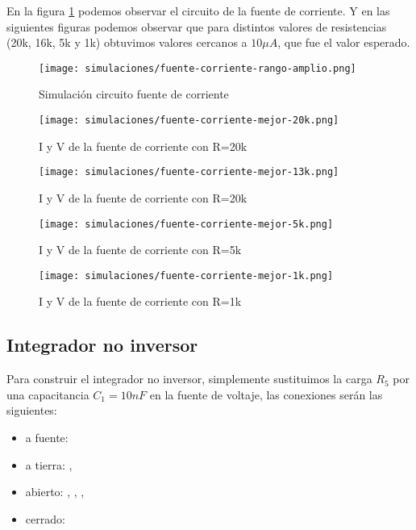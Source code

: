 En la figura \ref{fig:sim-fuente-corriente} podemos observar el circuito de la fuente de corriente. Y en las siguientes figuras podemos observar que para distintos valores de resistencias (20k, 16k, 5k y 1k) obtuvimos valores cercanos a $10\mu A$, que fue el valor esperado.

\begin{figure}[ht]
    \centering
    \texttt{[image: simulaciones/fuente-corriente-rango-amplio.png]}
    \caption{Simulación circuito fuente de corriente}
    \label{fig:sim-fuente-corriente}
\end{figure}
\begin{figure}[ht]
    \centering
    \texttt{[image: simulaciones/fuente-corriente-mejor-20k.png]}
    \caption{I y V de la fuente de corriente con R=20k}
    \label{fig:sim-fuente-corriente-20k}
\end{figure}
\begin{figure}[ht]
    \centering
    \texttt{[image: simulaciones/fuente-corriente-mejor-13k.png]}
    \caption{I y V de la fuente de corriente con R=20k}
    \label{fig:sim-fuente-corriente-13k}
\end{figure}
\begin{figure}[ht]
    \centering
    \texttt{[image: simulaciones/fuente-corriente-mejor-5k.png]}
    \caption{I y V de la fuente de corriente con R=5k}
    \label{fig:sim-fuente-corriente-5k}
\end{figure}
\begin{figure}[ht]
    \centering
    \texttt{[image: simulaciones/fuente-corriente-mejor-1k.png]}
    \caption{I y V de la fuente de corriente con R=1k}
    \label{fig:sim-fuente-corriente-1k}
\end{figure}


\FloatBarrier
\subsection{Integrador no inversor}

Para construir el integrador no inversor, simplemente sustituimos la carga $R_5$ por una capacitancia $C_1 = 10nF$ en la fuente de voltaje, las conexiones serán las siguientes:

\begin{itemize}
    \item a fuente: 
    \item a tierra: , 
    \item abierto: , , , 
    \item cerrado: 
\end{itemize}

